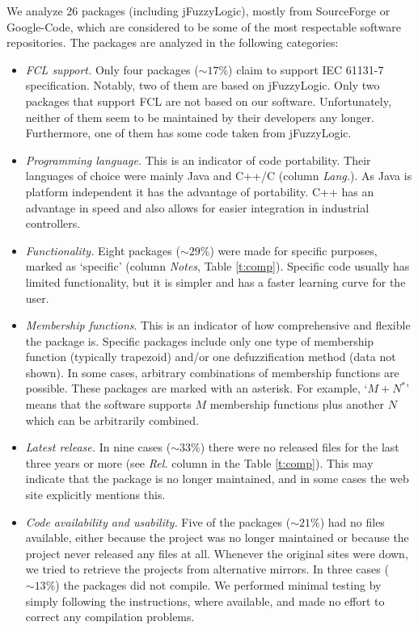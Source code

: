 \documentclass[11pt,twoside]{article}
\begin{document}
\begin{multicols}{2}
We analyze 26 packages (including jFuzzyLogic), mostly from SourceForge or Google-Code, which are considered to be some of the most respectable software repositories. The packages are analyzed in the following categories:
\begin{itemize}
\item \textit{FCL support.} Only four packages ($\sim 17\%$) claim to support IEC 61131-7 specification. Notably, two of them are based on jFuzzyLogic. Only two packages that support FCL are not based on our software. Unfortunately, neither of them seem to be maintained by their developers any longer. Furthermore, one of them has some code taken from jFuzzyLogic.
\item \textit{Programming language.} This is an indicator of code portability. Their languages of choice were mainly Java and C++/C (column \textit{Lang.}). As Java is platform independent it has the advantage of portability. C++ has an advantage in speed and also allows for easier integration in industrial controllers.
\item \textit{Functionality.} Eight packages ($\sim 29\%$) were made for specific purposes, marked as `specific' (column \textit{Notes}, Table \ref{t:comp}). Specific code usually has limited functionality, but it is simpler and has a faster learning curve for the user.
\item \textit{Membership functions}. This is an indicator of how comprehensive and flexible the package is. Specific packages include only one type of membership function (typically trapezoid) and/or one defuzzification method (data not shown). In some cases, arbitrary combinations of membership functions are possible. These packages are marked with an asterisk. For example, `$M+N^*$' means that the software supports $M$ membership functions plus another $N$ which can be arbitrarily combined. 
\item \textit{Latest release.} In nine cases ($\sim 33\%$) there were no released files for the last three years or more (see \textit{Rel.} column in the Table \ref{t:comp}). This may indicate that the package is no longer maintained, and in some cases the web site explicitly mentions this.
\item \textit{Code availability and usability.} Five of the packages ($\sim 21\%$) had no files available, either because the project was no longer maintained or because the project never released any files at all. Whenever the original sites were down, we tried to retrieve the projects from alternative mirrors. In three cases ($\sim 13\%$) the packages did not compile. We performed minimal testing by simply following the instructions, where available, and made no effort to correct any compilation problems. 

\end{itemize}
\end{multicols}
\end{document}
